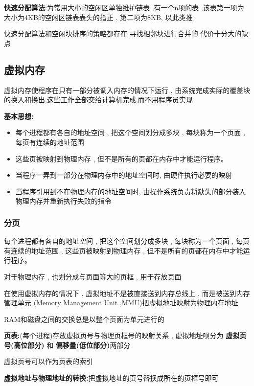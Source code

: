 \documentclass[UTF8,a4paper]{ctexart}
\begin{document}
\textbf{快速分配算法}:为常用大小的空闲区单独维护链表 ,有一个n项的表 ,该表第一项为大小为4KB的空闲区链表表头的指正 , 第二项为8KB, 以此类推

快速分配算法和空闲块排序的策略都存在 寻找相邻块进行合并的 代价十分大的缺点

\subsection{虚拟内存}
虚拟内存使程序在只有一部分被调入内存的情况下运行 , 由系统完成实际的覆盖块的换入和换出,这些工作全部交给计算机完成,而不用程序员实现

\textbf{基本思想:}
\begin{itemize}
	\item 每个进程都有各自的地址空间 , 把这个空间划分成多块 , 每块称为一个页面 , 每页有连续的地址范围
	\item 这些页被映射到物理内存 , 但不是所有的页都在内存中才能运行程序。
	\item 当程序一弄到一部分在物理内存中的地址空间时, 由硬件执行必要的映射
	\item 当程序引用到不在物理内存的地址空间时, 由操作系统负责将缺失的部分装入物理内存并重新执行失败的指令
\end{itemize}

\subsubsection{分页}
每个进程都有各自的地址空间 , 把这个空间划分成多块 , 每块称为一个页面 , 每页有连续的地址范围 , 这些页被映射到物理内存 , 但不是所有的页都在内存中才能运行程序。

对于物理内存 , 也划分成与页面等大的页框 , 用于存放页面

在使用虚拟内存的情况下 , 虚拟地址不是被直接送到内存总线上 , 而是被送到内存管理单元 (Memory Management Unit ,MMU)把虚拟地址映射为物理内存地址

RAM和磁盘之间的交换总是以整个页面为单元进行的

\textbf{页表:}(每个进程)存放虚拟页号与物理页框号的映射关系 , 虚拟地址呗分为 \textbf{虚拟页号(高位部分)} 和 \textbf{偏移量(低位部分)}两部分

虚拟页号可以作为页表的索引

\textbf{虚拟地址与物理地址的转换:}把虚拟地址的页号替换成所在的页框号即可
\end{document}
